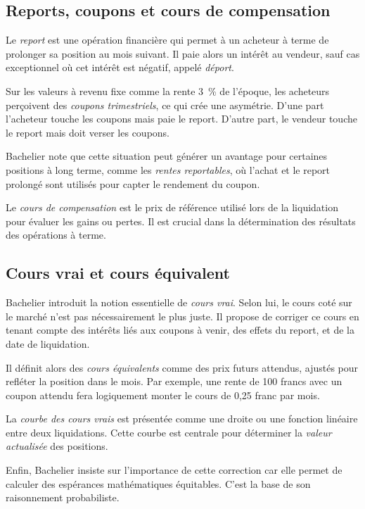 \documentclass[12pt,a4paper]{article}
\begin{document}
\subsection{Reports, coupons et cours de compensation}

Le \textit{report} est une opération financière qui permet à un acheteur à terme de prolonger sa position au mois suivant. Il paie alors un intérêt au vendeur, sauf cas exceptionnel où cet intérêt est négatif, appelé \textit{déport}.

Sur les valeurs à revenu fixe comme la rente 3~\% de l’époque, les acheteurs perçoivent des \textit{coupons trimestriels}, ce qui crée une asymétrie. D'une part l’acheteur touche les coupons mais paie le report. D'autre part, le vendeur touche le report mais doit verser les coupons.

Bachelier note que cette situation peut générer un avantage pour certaines positions à long terme, comme les \textit{rentes reportables}, où l’achat et le report prolongé sont utilisés pour capter le rendement du coupon.

Le \textit{cours de compensation} est le prix de référence utilisé lors de la liquidation pour évaluer les gains ou pertes. Il est crucial dans la détermination des résultats des opérations à terme.

\subsection{Cours vrai et cours équivalent}

Bachelier introduit la notion essentielle de \textit{cours vrai}. Selon lui, le cours coté sur le marché n’est pas nécessairement le plus juste. Il propose de corriger ce cours en tenant compte des intérêts liés aux coupons à venir, des effets du report, et de la date de liquidation.

Il définit alors des \textit{cours équivalents} comme des prix futurs attendus, ajustés pour refléter la position dans le mois. Par exemple, une rente de 100 francs avec un coupon attendu fera logiquement monter le cours de 0{,}25 franc par mois.

La \textit{courbe des cours vrais} est présentée comme une droite ou une fonction linéaire entre deux liquidations. Cette courbe est centrale pour déterminer la \textit{valeur actualisée} des positions.

Enfin, Bachelier insiste sur l'importance de cette correction car elle permet de calculer des espérances mathématiques équitables. C'est la base de son raisonnement probabiliste.
\end{document}
